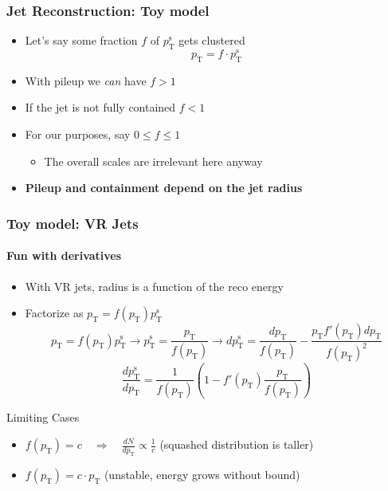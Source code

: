 \documentclass[xcolor={table}]{beamer}
\newcommand{\pt}{p_{\mathrm{T}}}
\newcommand{\ptr}{\pt}
\newcommand{\ptt}{\pt^{\text{s}}}
\begin{document}
\begin{frame}
  \frametitle{Jet Reconstruction: Toy model}
  \begin{itemize}
  \item Let's say some fraction $f$ of $\ptt$ gets clustered
    \[\ptr = f \cdot \ptt \]
  \item With pileup we \emph{can} have $f > 1$
  \item If the jet is not fully contained $f < 1$
  \item For our purposes, say $0 \leq f \leq 1$
    \begin{itemize}
    \item The overall scales are irrelevant here anyway
    \end{itemize}
  \item \textbf{Pileup and containment depend on the jet radius}
  \end{itemize}
\end{frame}

\begin{frame}
  \frametitle{Toy model: VR Jets}
  \framesubtitle{Fun with derivatives}
  \begin{itemize}
  \item With VR jets, radius is a function of the reco energy
  \item Factorize as $\boxed{\ptr = f(\ptr) \ptt}$
    \[ \ptr = f(\ptr) \ptt \to \ptt = \frac{\ptr}{f(\ptr)} \to d\ptt = \frac{d\ptr}{f(\ptr)} - \frac{\ptr f'(\ptr) d\ptr}{f(\ptr)^2} \]
    \[ \boxed{ \frac{d\ptt}{d\ptr} = \frac{1}{f(\ptr)} \left( 1 - f'(\ptr) \frac{\ptr}{f(\ptr)} \right) } \]
  \end{itemize}
  \begin{block}{Limiting Cases}
    \begin{itemize}
    \item $f(\ptr) = c \quad \Rightarrow \quad \frac{dN}{d\ptr} \propto \frac{1}{c}$ (squashed distribution is taller)
    \item $f(\ptr) = c \cdot \ptr$ (unstable, energy grows without bound)
    \end{itemize}
  \end{block}
\end{frame}
\end{document}
